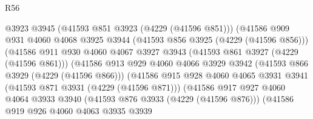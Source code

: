 \begin{lexlean}{R56}
\begin{coremodule}
                                    @3923
                                    @3945
                                    (@41593 @851 @3923 (@4229 (@41596 @851)))
                                    (@41586
                                      @909
                                      @931
                                      @4060
                                      @4068
                                      @3925
                                      @3944
                                      (@41593 @856 @3925 (@4229 (@41596 @856)))
                                      (@41586
                                        @911
                                        @930
                                        @4060
                                        @4067
                                        @3927
                                        @3943
                                        (@41593 @861 @3927 (@4229 (@41596 @861)))
                                        (@41586
                                          @913
                                          @929
                                          @4060
                                          @4066
                                          @3929
                                          @3942
                                          (@41593 @866 @3929 (@4229 (@41596 @866)))
                                          (@41586
                                            @915
                                            @928
                                            @4060
                                            @4065
                                            @3931
                                            @3941
                                            (@41593 @871 @3931 (@4229 (@41596 @871)))
                                            (@41586
                                              @917
                                              @927
                                              @4060
                                              @4064
                                              @3933
                                              @3940
                                              (@41593 @876 @3933 (@4229 (@41596 @876)))
                                              (@41586
                                                @919
                                                @926
                                                @4060
                                                @4063
                                                @3935
                                                @3939

\end{coremodule}
\end{lexlean}
